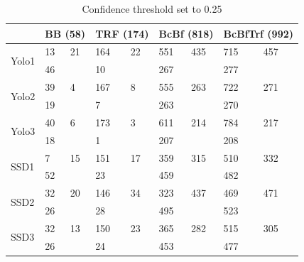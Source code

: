 \begin{table}[]
\centering
\begin{tabular}{l|ll|ll|ll|ll}
                       & \multicolumn{2}{l|}{BB (58)} & \multicolumn{2}{l|}{TRF (174)} & \multicolumn{2}{l|}{BcBf (818)} & \multicolumn{2}{l}{BcBfTrf (992)} \\ \hline
\multirow{2}{*}{Yolo1} & 13            & 21           & 164            & 22            & 551            & 435            & 715              & 457             \\
                       & 46            &              & 10             &               & 267            &                & 277              &                 \\ \hline

\multirow{2}{*}{Yolo2} & 39            & 4            & 167            & 8             & 555            & 263            & 722              & 271             \\
                       & 19            &              & 7              &               & 263            &                & 270              &                 \\ \hline
\multirow{2}{*}{Yolo3} & 40            & 6            & 173            & 3             & 611            & 214            & 784              & 217             \\
                       & 18            &              & 1              &               & 207            &                & 208              &                 \\ \hline
\multirow{2}{*}{SSD1}  & 7             & 15           & 151            & 17            & 359            & 315            & 510              & 332             \\
                       & 52            &              & 23             &               & 459            &                & 482              &                 \\ \hline
\multirow{2}{*}{SSD2}  & 32            & 20           & 146            & 34            & 323            & 437            & 469              & 471             \\
                       & 26            &              & 28             &               & 495            &                & 523              &                 \\ \hline

\multirow{2}{*}{SSD3}  & 32            & 13           & 150            & 23            & 365            & 282            & 515              & 305             \\
                       & 26            &              & 24             &               & 453            &                & 477              &                
\end{tabular}
\caption{Confidence threshold set to 0.25}
\end{table}


